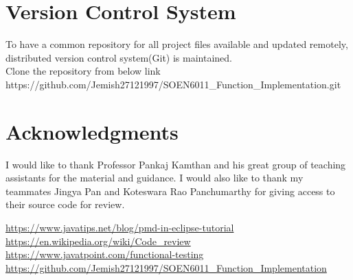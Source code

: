 \documentclass[12pt]{report}
\begin{document}
{\section{Version Control System}
To have a common repository for all project files available and updated remotely, distributed version control system(Git) is maintained.
\\Clone the repository from below link\\
https://github.com/Jemish27121997/SOEN6011\_Function\_Implementation.git

\section{Acknowledgments}
I would like to thank Professor Pankaj Kamthan and his great group of teaching assistants for the material and guidance. I would also like to thank my teammates Jingya Pan and Koteswara Rao Panchumarthy for giving access to their source code for review.

\begin{thebibliography}{9}
\url{https://www.javatips.net/blog/pmd-in-eclipse-tutorial}
\url{https://en.wikipedia.org/wiki/Code_review}
\url{https://www.javatpoint.com/functional-testing}
\url{https://github.com/Jemish27121997/SOEN6011_Function_Implementation}
\end{thebibliography}
}
\end{document}
